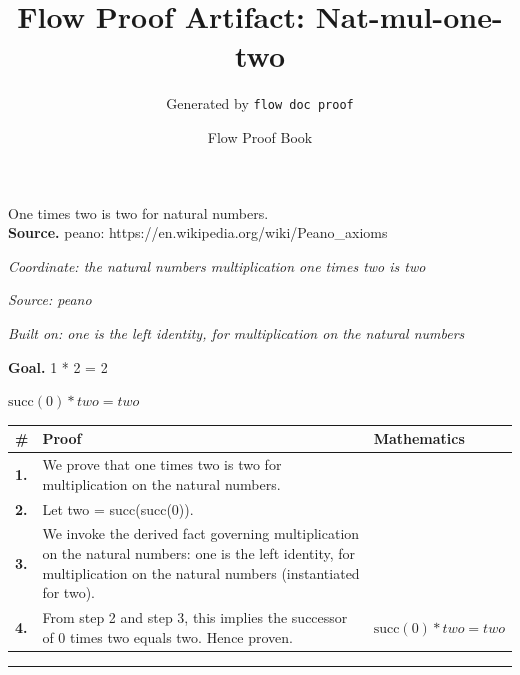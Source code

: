 \documentclass[11pt]{article}
\title{Flow Proof Artifact: Nat-mul-one-two}
\author{Generated by \texttt{flow doc proof}}
\date{Flow Proof Book}
\theoremstyle{definition}
\begin{document}
\maketitle
One times two is two for natural numbers.\\[0.5em]
\textbf{Source.} peano: https://en.wikipedia.org/wiki/Peano\_axioms\\[0.5em]
\bigskip
{}\par
\smallskip\noindent\textit{Coordinate: the natural numbers \cdot multiplication \cdot one times two is two}\par
\smallskip\noindent\textit{Source: peano}\par
\smallskip\noindent\textit{Built on: one is the left identity, for multiplication on the natural numbers}\par
\medskip
\noindent\textbf{Goal.} 1 * 2 = 2\par
\noindent$\displaystyle \mathrm{succ}(0) * two = two$\par
\medskip
\noindent
\begin{tabular}{@{} >{\raggedright\arraybackslash}p{} >{\raggedright\arraybackslash}p{} >{\raggedleft\arraybackslash}p{} @{}}
\textbf{\#} & \textbf{Proof} & \textbf{Mathematics} \\
\midrule
\textbf{1.} & We prove that one times two is two for multiplication on the natural numbers. & \\[0.45em]
\textbf{2.} & Let two = succ(succ(0)). & \\[0.45em]
\textbf{3.} & We invoke the derived fact governing multiplication on the natural numbers: one is the left identity, for multiplication on the natural numbers (instantiated for two). & \\[0.45em]
\textbf{4.} & From step 2 and step 3, this implies the successor of 0 times two equals two. Hence proven. & $\displaystyle \mathrm{succ}(0) * two = two$ \\[0.45em]
\bottomrule
\end{tabular}
\label{thm:Nat-multiplication-one_times_two_is_two}
\par\medskip\hrule
\end{document}
